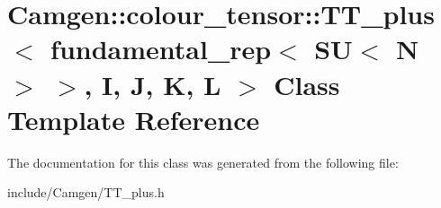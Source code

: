 \hypertarget{a00555}{}\section{Camgen\+:\+:colour\+\_\+tensor\+:\+:T\+T\+\_\+plus$<$ fundamental\+\_\+rep$<$ S\+U$<$ N $>$ $>$, I, J, K, L $>$ Class Template Reference}
\label{a00555}


The documentation for this class was generated from the following file\+:\begin{DoxyCompactItemize}
\item 
include/\+Camgen/T\+T\+\_\+plus.\+h\end{DoxyCompactItemize}
